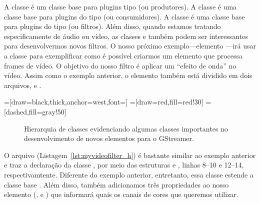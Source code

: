 A classe  é um classe base para plugins tipo  (ou
produtores).  A classe  é uma classe base para plugins do tipo
 (ou consumidores).  A classe  é uma classe base
para plugins do tipo  (ou filtros).  Além disso, quando estamos
tratando especificamente de áudio ou vídeo, as classes  e
 também podem ser interessantes para desenvolvermos novos
filtros.  O nosso próximo exemplo---elemento ---irá usar a
classe  para exemplificar como é possível criarmos um
elemento que processa frames de vídeo.  O objetivo do nosso filtro é aplicar um
``efeito de onda'' no vídeo.  Assim como o exemplo anterior, o elemento
 também está dividido em dois arquivos, 
e .

=[draw=black,thick,anchor=west,font=\scriptsize]
=[draw=red,fill=red!30]
=[dashed,fill=gray!50]
\begin{figure}[H]
  \centering
  \label{fig:plugins_base_classes}
  \caption{Hierarquia de classes evidenciando algumas classes importantes no
           desenvolvimento de novos elementos para o GStreamer.}
\end{figure}

O arquivo  (Listagem~\ref{lst:myvideofilter_h}) é bastante
similar ao exemplo anterior e traz a declaração da classe ,
por meio das estruturas  e ,
linhas 8--10 e 12--14, respectivamtente.  Diferente do exemplo anterior,
entretanto, essa classe estende a classe base .  Além disso,
também adicionamos três propriedades ao nosso elemento (,  e
) que informará quais os canais de cores que queremos utilizar.

